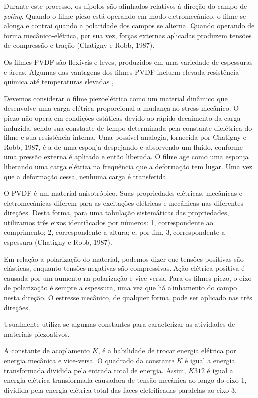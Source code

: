 \documentclass[
	12pt,				
	oneside,			
	a4paper,			
	english,			
	brazil				
	]{abntex2ppgsi}
\begin{document}
Durante este processo, os dípolos são alinhados relativos à direção do campo de \textit{poling}. Quando o filme piezo está operando em modo eletromecânico, o filme se alonga e contrai quando a polaridade dos campos se alterna. Quando operando de forma mecânico-elétrica, por sua vez, forças externas aplicadas produzem tensões de compressão e tração (Chatigny e Robb, 1987). 

Os filmes PVDF são flexíveis e leves, produzidos em uma variedade de espessuras e áreas. Algumas das vantagens dos filmes PVDF incluem elevada resistência química até temperaturas elevadas , 

Devemos considerar o filme piezoelétrico como um material dinâmico que desenvolve uma carga elétrica proporcional a mudança no stress mecânico. O piezo não opera em condições estáticas devido ao rápido decaimento da carga induzida, sendo sua constante de tempo determinada pela constante dielétrica do filme e sua resistência interna. 	Uma possível analogia, fornecida por Chatigny e Robb, 1987, é a de uma esponja despejando e absorvendo um fluido, conforme uma pressão externa é aplicada e então liberada. O filme age como uma esponja liberando uma carga elétrica na frequência que a deformação tem lugar. Uma vez que a deformação cessa, nenhuma carga é transferida. 

O PVDF é um material anisotrópico.  Suas propriedades elétricas, mecânicas e eletromecânicas diferem para as excitações elétricas e mecânicas nas diferentes direções. Desta forma, para uma tabulação sistemáticas das propriedades, utilizamos três eixos identificados por números: 1, correspondente ao comprimento; 2, correspondente a altura; e, por fim, 3, correspondente a espessura (Chatigny e Robb, 1987). 

Em relação a polarização do material, podemos dizer que tensões positivas são elásticas, enquanto tensões negativas são compressivas. Ação elétrica positiva é causada por um aumento na polarização e vice-versa. Para os filmes piezo, o eixo de polarização é sempre a espessura, uma vez que há alinhamento do campo nesta direção. O estresse mecânico, de qualquer forma, pode ser aplicado nas três direções. 

Usualmente utiliza-se algumas constantes para caracterizar as atividades de materiais piezoativos. 

A constante de acoplamento $K$, é a habilidade de trocar energia elétrica por energia mecânica e vice-versa. O quadrado da constante $K$ é igual a energia transformada dividida pela entrada total de energia. Assim, $K312$ é igual a energia elétrica transformada causadora de tensão mecânica ao longo do eixo 1, dividida pela energia elétrica total das faces eletrificadas paralelas ao eixo 3. 
\end{document}

